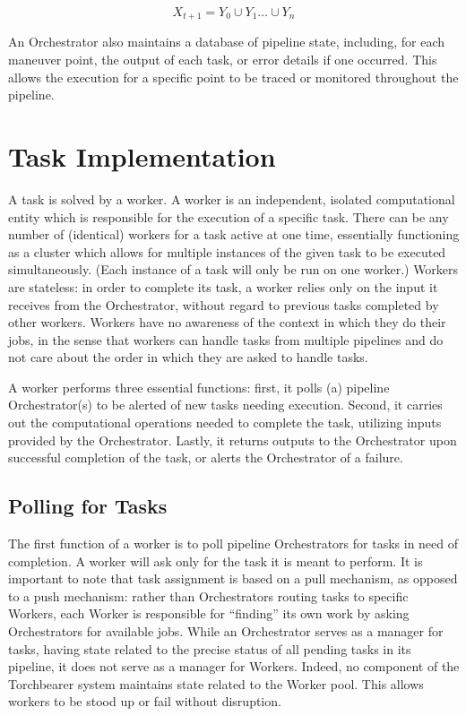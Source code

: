 \begin{equation}\label{eq:paraOrch}
    X_{t+1} = Y_0 \cup Y_1 \dots \cup Y_n
\end{equation}

An Orchestrator also maintains a database of pipeline state, including, for each maneuver point, the output of each task, or error details if one occurred. This allows the execution for a specific point to be traced or monitored throughout the pipeline.

\section{Task Implementation}\label{sec:arch:pipeline_imp}
A task is solved by a worker. A worker is an independent, isolated computational entity which is responsible for the execution of a specific task. There can be any number of (identical) workers for a task active at one time, essentially functioning as a cluster which allows for multiple instances of the given task to be executed simultaneously. (Each instance of a task will only be run on one worker.)  Workers are stateless: in order to complete its task, a worker relies only on the input it receives from the Orchestrator, without regard to previous tasks completed by other workers. Workers have no awareness of the context in which they do their jobs, in the sense that workers can handle tasks from multiple pipelines and do not care about the order in which they are asked to handle tasks. 

A worker performs three essential functions: first, it polls (a) pipeline Orchestrator(s) to be alerted of new tasks needing execution. Second, it carries out the computational operations needed to complete the task, utilizing inputs provided by the Orchestrator. Lastly, it returns outputs to the Orchestrator upon successful completion of the task, or alerts the Orchestrator of a failure. 
 
\subsection{Polling for Tasks}
The first function of a worker is to poll pipeline Orchestrators for tasks in need of completion. A worker will ask only for the task it is meant to perform. It is important to note that task assignment is based on a pull mechanism, as opposed to a push mechanism: rather than Orchestrators routing tasks to specific Workers, each Worker is responsible for “finding” its own work by asking Orchestrators for available jobs. While an Orchestrator serves as a manager for tasks, having state related to the precise status of all pending tasks in its pipeline, it does not serve as a manager for Workers. Indeed, no component of the Torchbearer system maintains state related to the Worker pool. This allows workers to be stood up or fail without disruption.

